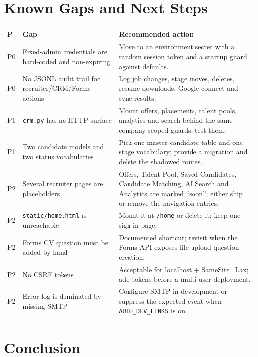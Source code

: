 \documentclass[11pt,a4paper]{article}
\newcommand{\file}[1]{\texttt{\small #1}}
\newcommand{\env}[1]{\texttt{\small #1}}
\begin{document}
\section{Known Gaps and Next Steps}
\label{u:gaps}

\begin{center}
\begin{longtable}{@{}p{0.6cm}p{5.9cm}p{8.1cm}@{}}
\toprule
\textbf{P} & \textbf{Gap} & \textbf{Recommended action}\\
\midrule
\endhead
P0 & Fixed-admin credentials are hard-coded and non-expiring &
  Move to an environment secret with a random session token and a startup
  guard against defaults.\\
P0 & No JSONL audit trail for recruiter/CRM/Forms actions &
  Log job changes, stage moves, deletes, resume downloads, Google connect and
  sync results.\\
P1 & \file{crm.py} has no HTTP surface &
  Mount offers, placements, talent pools, analytics and search behind the
  same company-scoped guards; test them.\\
P1 & Two candidate models and two status vocabularies &
  Pick one master candidate table and one stage vocabulary; provide a
  migration and delete the shadowed routes.\\
P2 & Several recruiter pages are placeholders &
  Offers, Talent Pool, Saved Candidates, Candidate Matching, AI Search and
  Analytics are marked ``soon''; either ship or remove the navigation entries.\\
P2 & \file{static/home.html} is unreachable &
  Mount it at \file{/home} or delete it; keep one sign-in page.\\
P2 & Forms CV question must be added by hand &
  Documented shortcut; revisit when the Forms API exposes file-upload
  question creation.\\
P2 & No CSRF tokens &
  Acceptable for localhost + SameSite=Lax; add tokens before a multi-user
  deployment.\\
P2 & Error log is dominated by missing SMTP &
  Configure SMTP in development or suppress the expected event when
  \env{AUTH\_DEV\_LINKS} is on.\\
\bottomrule
\end{longtable}
\end{center}

\section{Conclusion}
\label{u:conclusion}
\end{document}

